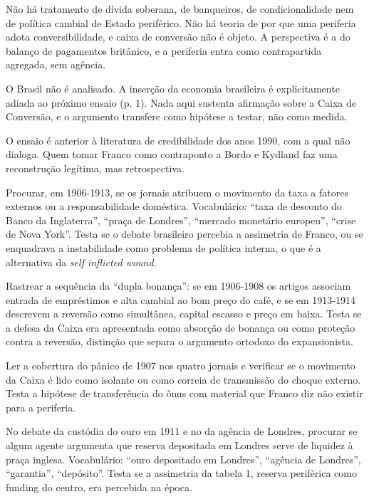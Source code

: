 Não há tratamento de dívida soberana, de banqueiros, de condicionalidade nem de
política cambial de Estado periférico. Não há teoria de por que uma periferia
adota conversibilidade, e caixa de conversão não é objeto. A perspectiva é a do
balanço de pagamentos britânico, e a periferia entra como contrapartida
agregada, sem agência.

O Brasil não é analisado. A inserção da economia brasileira é explicitamente
adiada ao próximo ensaio (p. 1). Nada aqui sustenta afirmação sobre a Caixa de
Conversão, e o argumento transfere como hipótese a testar, não como medida.

O ensaio é anterior à literatura de credibilidade dos anos 1990, com a qual não
dialoga. Quem tomar Franco como contraponto a Bordo e Kydland faz uma
reconstrução legítima, mas retrospectiva.

\begin{dialogo}
\item Procurar, em 1906-1913, se os jornais atribuem o movimento da taxa a
fatores externos ou a responsabilidade doméstica. Vocabulário: ``taxa de
desconto do Banco da Inglaterra'', ``praça de Londres'', ``mercado monetário
europeu'', ``crise de Nova York''. Testa se o debate brasileiro percebia a
assimetria de Franco, ou se enquadrava a instabilidade como problema de
política interna, o que é a alternativa da \textit{self inflicted wound}.

\item Rastrear a sequência da ``dupla bonança'': se em 1906-1908 os artigos
associam entrada de empréstimos e alta cambial ao bom preço do café, e se em
1913-1914 descrevem a reversão como simultânea, capital escasso e preço em
baixa. Testa se a defesa da Caixa era apresentada como absorção de bonança ou
como proteção contra a reversão, distinção que separa o argumento ortodoxo do
expansionista.

\item Ler a cobertura do pânico de 1907 nos quatro jornais e verificar se o
movimento da Caixa é lido como isolante ou como correia de transmissão do
choque externo. Testa a hipótese de transferência do ônus com material que
Franco diz não existir para a periferia.

\item No debate da custódia do ouro em 1911 e no da agência de Londres,
procurar se algum agente argumenta que reserva depositada em Londres serve de
liquidez à praça inglesa. Vocabulário: ``ouro depositado em Londres'',
``agência de Londres'', ``garantia'', ``depósito''. Testa se a assimetria da
tabela 1, reserva periférica como funding do centro, era percebida na época.
\end{dialogo}

